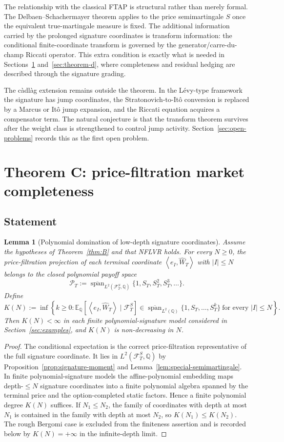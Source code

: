 \documentclass[11pt,oneside]{article}
\theoremstyle{plain}
\newtheorem{lemma}[theorem]{Lemma}
\theoremstyle{definition}
\theoremstyle{remark}
\newcommand{\E}{\mathbb{E}}
\newcommand{\Q}{\mathbb{Q}}
\newcommand{\cW}{\widehat W}
\newcommand{\FS}{\mathcal F^S}
\newcommand{\inner}[2]{\left\langle #1,#2\right\rangle}
\newcommand{\clspan}{\overline{\operatorname{span}}}
\begin{document}
The relationship with the classical FTAP is structural rather than merely formal. The Delbaen--Schachermayer theorem applies to the price semimartingale $S$ once the equivalent true-martingale measure is fixed. The additional information carried by the prolonged signature coordinates is transform information: the conditional finite-coordinate transform is governed by the generator/carre-du-champ Riccati operator. This extra condition is exactly what is needed in Sections~\ref{sec:theorem-c} and~\ref{sec:theorem-d}, where completeness and residual hedging are described through the signature grading.

The c\`adl\`ag extension remains outside the theorem. In the L\'evy-type framework the signature has jump coordinates, the Stratonovich-to-It\^o conversion is replaced by a Marcus or It\^o jump expansion, and the Riccati equation acquires a compensator term. The natural conjecture is that the transform theorem survives after the weight class is strengthened to control jump activity. Section~\ref{sec:open-problems} records this as the first open problem.


\section{Theorem C: price-filtration market completeness}\label{sec:theorem-c}

\subsection{Statement}

\begin{lemma}[Polynomial domination of low-depth signature coordinates]\label{lem:poly-domination}
Assume the hypotheses of Theorem~\ref{thm:B} and that NFLVR holds. For every $N\geq0$, the price-filtration projection of each terminal coordinate $\inner{e_I}{\cW_T}$ with $|I|\leq N$ belongs to the closed polynomial payoff space
\[
\mathcal P_T:=\clspan_{L^2(\FS_T,\Q)}\{1,S_T,S_T^2,S_T^3,\ldots\}.
\]
Define
\[
K(N):=\inf\left\{k\geq0:\E_\Q[\inner{e_I}{\cW_T}\mid\FS_T]\in\clspan_{L^2(\Q)}\{1,S_T,\ldots,S_T^k\}\ \text{for every } |I|\leq N\right\}.
\]
Then $K(N)<\infty$ in each finite polynomial-signature model considered in Section~\ref{sec:examples}, and $K(N)$ is non-decreasing in $N$.
\end{lemma}

\begin{proof}
The conditional expectation is the correct price-filtration representative of the full signature coordinate. It lies in $L^2(\FS_T,\Q)$ by Proposition~\ref{prop:signature-moment} and Lemma~\ref{lem:special-semimartingale}. In finite polynomial-signature models the affine-polynomial embedding maps depth-$\leq N$ signature coordinates into a finite polynomial algebra spanned by the terminal price and the option-completed static factors. Hence a finite polynomial degree $K(N)$ suffices. If $N_1\leq N_2$, the family of coordinates with depth at most $N_1$ is contained in the family with depth at most $N_2$, so $K(N_1)\leq K(N_2)$. The rough Bergomi case is excluded from the finiteness assertion and is recorded below by $K(N)=+\infty$ in the infinite-depth limit.
\end{proof}
\end{document}
